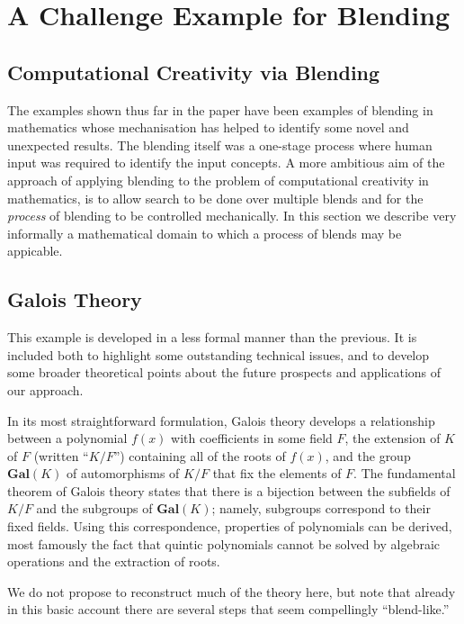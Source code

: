 \section{A Challenge Example for Blending} \label{galois}

\subsection{Computational Creativity via Blending}

The examples shown thus far in the paper have been examples of
blending in mathematics whose mechanisation has helped to identify
some novel and unexpected results. The blending itself was a one-stage
process where human input was required to identify the input
concepts. A more ambitious aim of the approach of applying blending to
the problem of computational creativity in mathematics, is to allow
search to be done over multiple blends and for the {\em process} of
blending to be controlled mechanically. In this section we describe
very informally a mathematical domain to which a process of blends may
be appicable.

\subsection{Galois Theory}

This example is developed in a less formal manner than the previous.
It is included both to highlight some outstanding technical issues,
and to develop some broader theoretical points about the future
prospects and applications of our approach.  

In its most straightforward formulation, Galois theory develops a
relationship between a polynomial $f(x)$ with coefficients in some
field $F$, the extension of $K$ of $F$ (written ``$K/F$'') containing
all of the roots of $f(x)$, and the group $\mathbf{Gal}(K)$ of
automorphisms of $K/F$ that fix the elements of $F$.  The fundamental
theorem of Galois theory states that there is a bijection between the
subfields of $K/F$ and the subgroups of $\mathbf{Gal}(K)$;
namely, subgroups correspond to their fixed fields.  Using this
correspondence, properties of polynomials can be derived, most
famously the fact that quintic polynomials cannot be solved by
algebraic operations and the extraction of roots.  

We do not propose to reconstruct much of the theory here, but note
that already in this basic account there are several steps that seem
compellingly ``blend-like.''

